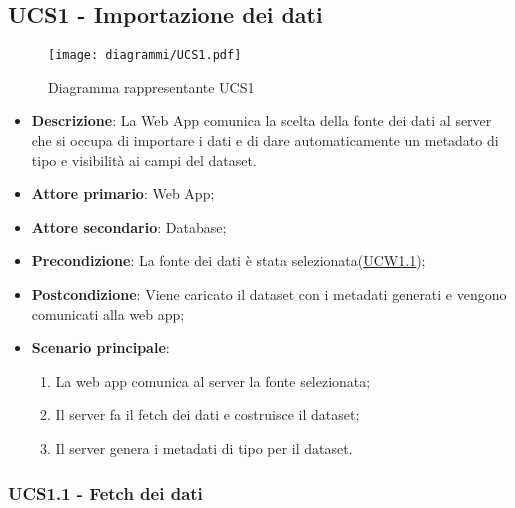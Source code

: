\subsection{UCS1 - Importazione dei dati}
\label{sub:ucs1}


\begin{figure}[h]
    \centering
    \texttt{[image: diagrammi/UCS1.pdf]}
    \caption{Diagramma rappresentante UCS1}
    \label{fig:UCS1}
\end{figure}

\begin{itemize}
    \item \textbf{Descrizione}: La Web App comunica la scelta della fonte dei dati al server che si occupa di importare i dati e di dare automaticamente un metadato di tipo e visibilità ai campi del dataset.
	
    \item \textbf{Attore primario}: Web App;
	\item \textbf{Attore secondario}: Database;
        
    \item \textbf{Precondizione}:   La fonte dei dati è stata selezionata(\hyperref[ssub:ucw1.1]{UCW1.1});

    \item \textbf{Postcondizione}:  Viene caricato il dataset con i metadati generati e vengono comunicati alla web app;

	\item \textbf{Scenario principale}:
		\begin{enumerate}
			\item La web app comunica al server la fonte selezionata;
            \item Il server fa il fetch dei dati e costruisce il dataset;
			\item Il server genera i metadati di tipo per il dataset.
        \end{enumerate}
   
\end{itemize}

\subsubsection{UCS1.1 - Fetch dei dati}
\label{ssub:ucs1.1}

